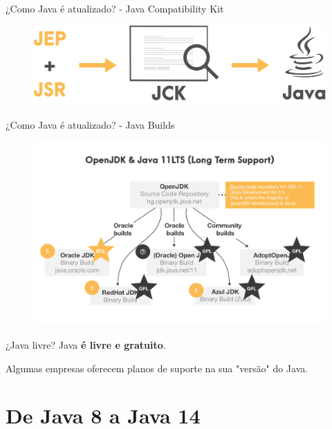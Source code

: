 \documentclass[aspectratio=169]{beamer}
\begin{document}
\begin{frame}[fragile]{¿Como Java é atualizado? - Java Compatibility Kit}
	\begin{figure}
		\centering
		\includegraphics[width=0.9\linewidth]{Images/jck}
	\end{figure}
	
\end{frame}

\begin{frame}[fragile]{¿Como Java é atualizado? - Java Builds}
	\begin{figure}
		\centering
		\includegraphics[width=0.9\linewidth]{Images/javabuilds}
	\end{figure}
	
\end{frame}

\begin{frame}[fragile]{¿Java livre?}
Java \textbf{é livre e gratuito}.

Algumas empresas oferecem planos de suporte na sua "versão" do Java.
\end{frame}

{
    \section{De Java 8 a Java 14}
}
\end{document}
